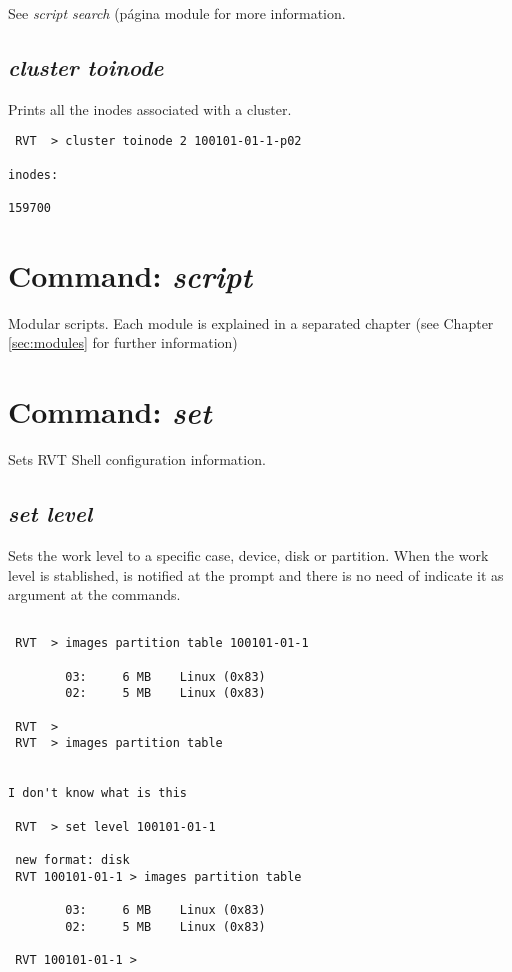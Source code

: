 \documentclass[a4paper,11pt,oneside]{report}
\begin{document}
See \emph{script search} (página \pageref{script:search} module for more information.


\subsection{\emph{cluster toinode}}

Prints all the inodes associated with a cluster.

\begin{verbatim}
 RVT  > cluster toinode 2 100101-01-1-p02                                     

inodes:

159700
\end{verbatim}


\section{Command: \emph{script}}

Modular scripts. Each module is explained in a separated chapter (see Chapter \ref{sec:modules} for further information)


\section{Command: \emph{set}}

Sets RVT Shell configuration information.

\subsection{\emph{set level}}

Sets the work level to a specific case, device, disk or partition. When the work level is stablished, is notified at the prompt and there is no need of indicate it as argument at the commands.

\begin{verbatim}

 RVT  > images partition table 100101-01-1                                    

        03:     6 MB    Linux (0x83)
        02:     5 MB    Linux (0x83)

 RVT  > 
 RVT  > images partition table


I don't know what is this

 RVT  > set level 100101-01-1                                                 

 new format: disk
 RVT 100101-01-1 > images partition table                                     

        03:     6 MB    Linux (0x83)
        02:     5 MB    Linux (0x83)

 RVT 100101-01-1 > 
\end{verbatim}
\end{document}
